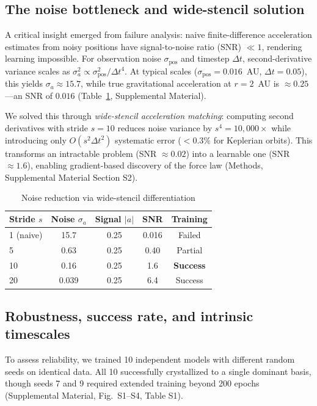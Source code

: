 \documentclass[aps,pre,reprint,superscriptaddress,longbibliography]{revtex4-2}
\begin{document}
\subsection{The noise bottleneck and wide-stencil solution}
A critical insight emerged from failure analysis: naive finite-difference acceleration estimates from noisy positions have signal-to-noise ratio (SNR) $\ll 1$, rendering learning impossible. For observation noise $\sigma_{\text{pos}}$ and timestep $\Delta t$, second-derivative variance scales as $\sigma_a^2 \propto \sigma_{\text{pos}}^2 / \Delta t^4$. At typical scales ($\sigma_{\text{pos}} = 0.016$~AU, $\Delta t = 0.05$), this yields $\sigma_a \approx 15.7$, while true gravitational acceleration at $r = 2$~AU is $\approx 0.25$---an SNR of $0.016$ (Table~\ref{tab:noise}, Supplemental Material).

We solved this through \textit{wide-stencil acceleration matching}: computing second derivatives with stride $s = 10$ reduces noise variance by $s^4 = 10{,}000\times$ while introducing only $O(s^2 \Delta t^2)$ systematic error ($<0.3\%$ for Keplerian orbits). This transforms an intractable problem (SNR $\approx 0.02$) into a learnable one (SNR $\approx 1.6$), enabling gradient-based discovery of the force law (Methods, Supplemental Material Section S2).

\begin{table}[!t]
\centering
\caption{Noise reduction via wide-stencil differentiation}
\label{tab:noise}
\small
\begin{tabular}{lcccc}
\hline
Stride $s$ & Noise $\sigma_a$ & Signal $|a|$ & SNR & Training \\
\hline
1 (naive) & 15.7 & 0.25 & 0.016 & Failed \\
5 & 0.63 & 0.25 & 0.40 & Partial \\
10 & 0.16 & 0.25 & 1.6 & \textbf{Success} \\
20 & 0.039 & 0.25 & 6.4 & Success \\
\hline
\end{tabular}
\end{table}

\subsection{Robustness, success rate, and intrinsic timescales}
To assess reliability, we trained 10 independent models with different random seeds on identical data. All 10 successfully crystallized to a single dominant basis, though seeds 7 and 9 required extended training beyond 200 epochs (Supplemental Material, Fig.~S1--S4, Table S1).
\end{document}
